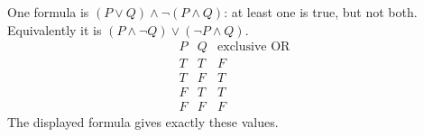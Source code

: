 One formula is $\boxed{(P\lor Q)\land\neg(P\land Q)}$: at least one is true, but not both. Equivalently it is $(P\land\neg Q)\lor(\neg P\land Q)$.
\[
\begin{array}{cc|c}
P&Q&\text{exclusive OR}\\\hline
T&T&F\\T&F&T\\F&T&T\\F&F&F
\end{array}
\]
The displayed formula gives exactly these values.
